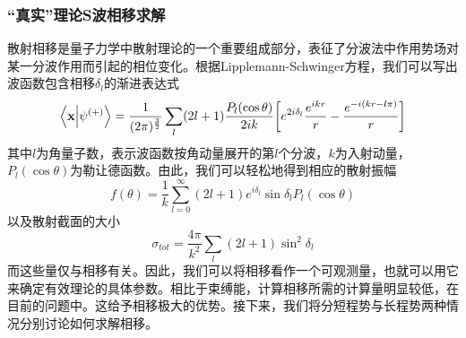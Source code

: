 \documentclass[cs4size,titlepage,twoside]{ctexart}
\begin{document}
\subsubsection{“真实”理论S波相移求解}
散射相移是量子力学中散射理论的一个重要组成部分，表征了分波法中作用势场对某一分波作用而引起的相位变化\cite{Chen}。根据Lipplemann-Schwinger方程，我们可以写出波函数包含相移$\delta_l$的渐进表达式\cite{sakurai}
\begin{equation}\label{xpsi}
	\braket{\vb{x}}{\psi^{(+)}}=\frac{1}{(2\pi)^{\frac{3}{2}}}\sum_l(2l+1)\frac{P_l(\cos\theta)}{2ik}\bqty{e^{2i\delta_l}\frac{e^{ikr}}{r}-\frac{e^{-i(kr-l\pi)}}{r}}
\end{equation}
其中$l$为角量子数，表示波函数按角动量展开的第$l$个分波，$k$为入射动量，$P_l(\cos\theta)$为勒让德函数。由此，我们可以轻松地得到相应的散射振幅\cite{sakurai}
\begin{equation}\label{psf}
	f(\theta)=\frac{1}{k}\sum_{l=0}^{\infty}(2l+1)e^{i\delta_l}\sin\delta_lP_l(\cos\theta)
\end{equation}
以及散射截面的大小
\begin{equation}
	\sigma_{tot}=\frac{4\pi}{k^2}\sum_l(2l+1)\sin^2\delta_l
\end{equation}
而这些量仅与相移有关。因此，我们可以将相移看作一个可观测量，也就可以用它来确定有效理论的具体参数。相比于束缚能，计算相移所需的计算量明显较低，在目前的问题中。这给予相移极大的优势。接下来，我们将分短程势与长程势两种情况分别讨论如何求解相移。
\end{document}
